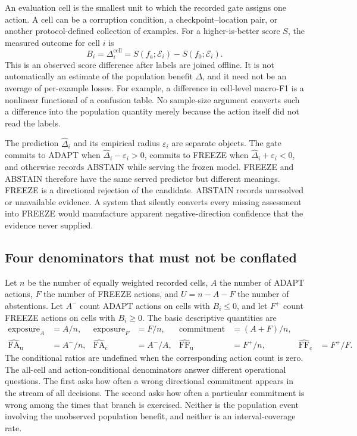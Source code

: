 An evaluation cell is the smallest unit to which the recorded gate assigns one action.  A cell can
be a corruption condition, a checkpoint--location pair, or another protocol-defined collection of
examples.  For a higher-is-better score $S$, the measured outcome for cell $i$ is
\begin{equation}
 B_i=\Delta_i^{\mathrm{cell}}
   =S(f_a;\mathcal E_i)-S(f_0;\mathcal E_i).
\label{fr:eq-observed-cell-benefit}
\end{equation}
This is an observed score difference after labels are joined offline.  It is not automatically an
estimate of the population benefit $\Delta$, and it need not be an average of per-example losses.
For example, a difference in cell-level macro-F1 is a nonlinear functional of a confusion table.
No sample-size argument converts such a difference into the population quantity merely because
the action itself did not read the labels.

The prediction $\widehat\Delta_i$ and its empirical radius $\varepsilon_i$ are separate objects.
The gate commits to ADAPT when $\widehat\Delta_i-\varepsilon_i>0$, commits to FREEZE when
$\widehat\Delta_i+\varepsilon_i<0$, and otherwise records ABSTAIN while serving the frozen model.
FREEZE and ABSTAIN therefore have the same served predictor but different meanings.  FREEZE is a
directional rejection of the candidate.  ABSTAIN records unresolved or unavailable evidence.  A
system that silently converts every missing assessment into FREEZE would manufacture apparent
negative-direction confidence that the evidence never supplied.

\subsection{Four denominators that must not be conflated}
\label{fr:sec-denominator-discipline}

Let $n$ be the number of equally weighted recorded cells, $A$ the number of ADAPT actions, $F$ the
number of FREEZE actions, and $U=n-A-F$ the number of abstentions.  Let $A^{-}$ count ADAPT actions
on cells with $B_i\le 0$, and let $F^{+}$ count FREEZE actions on cells with $B_i\ge 0$.  The basic
descriptive quantities are
\begin{align}
  \mathrm{exposure}_{A}&=A/n,&
  \mathrm{exposure}_{F}&=F/n,&
  \mathrm{commitment}&=(A+F)/n,\label{fr:eq-action-exposure}\\
  \widehat{\mathrm{FA}}_{\mathrm u}&=A^{-}/n,&
  \widehat{\mathrm{FA}}_{\mathrm c}&=A^{-}/A,&
  \widehat{\mathrm{FF}}_{\mathrm u}&=F^{+}/n,&
  \widehat{\mathrm{FF}}_{\mathrm c}&=F^{+}/F.
\label{fr:eq-directional-errors}
\end{align}
The conditional ratios are undefined when the corresponding action count is zero.  The all-cell
and action-conditional denominators answer different operational questions.  The first asks how
often a wrong directional commitment appears in the stream of all decisions.  The second asks how
often a particular commitment is wrong among the times that branch is exercised.  Neither is the
population event involving the unobserved population benefit, and neither is an interval-coverage
rate.


